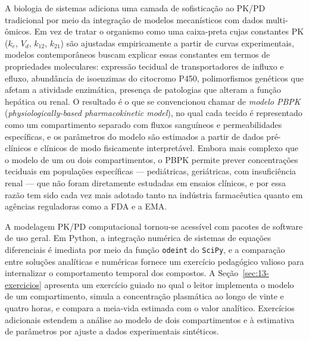 A biologia de sistemas adiciona uma camada de sofisticação ao PK/PD tradicional por meio da integração de modelos mecanísticos com dados multi-ômicos. Em vez de tratar o organismo como uma caixa-preta cujas constantes PK ($k_e$, $V_d$, $k_{12}$, $k_{21}$) são ajustadas empiricamente a partir de curvas experimentais, modelos contemporâneos buscam explicar essas constantes em termos de propriedades moleculares: expressão tecidual de transportadores de influxo e efluxo, abundância de isoenzimas do citocromo P450, polimorfismos genéticos que afetam a atividade enzimática, presença de patologias que alteram a função hepática ou renal. O resultado é o que se convencionou chamar de \emph{modelo PBPK} (\emph{physiologically-based pharmacokinetic model}), no qual cada tecido é representado como um compartimento separado com fluxos sanguíneos e permeabilidades específicas, e os parâmetros do modelo são estimados a partir de dados pré-clínicos e clínicos de modo fisicamente interpretável. Embora mais complexo que o modelo de um ou dois compartimentos, o PBPK permite prever concentrações teciduais em populações específicas --- pediátricas, geriátricas, com insuficiência renal --- que não foram diretamente estudadas em ensaios clínicos, e por essa razão tem sido cada vez mais adotado tanto na indústria farmacêutica quanto em agências reguladoras como a FDA e a EMA.

A modelagem PK/PD computacional tornou-se acessível com pacotes de software de uso geral. Em Python, a integração numérica de sistemas de equações diferenciais é imediata por meio da função \texttt{odeint} do \texttt{SciPy}, e a comparação entre soluções analíticas e numéricas fornece um exercício pedagógico valioso para internalizar o comportamento temporal dos compostos. A Seção~\ref{sec:13-exercicios} apresenta um exercício guiado no qual o leitor implementa o modelo de um compartimento, simula a concentração plasmática ao longo de vinte e quatro horas, e compara a meia-vida estimada com o valor analítico. Exercícios adicionais estendem a análise ao modelo de dois compartimentos e à estimativa de parâmetros por ajuste a dados experimentais sintéticos.


